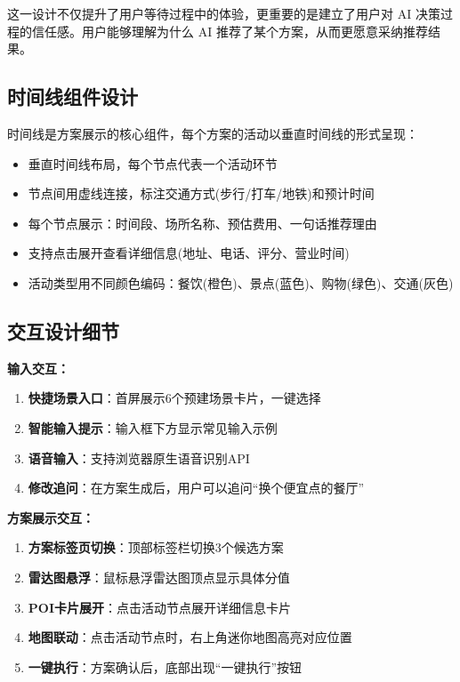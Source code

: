 \documentclass[12pt,a4paper]{ctexart}
\begin{document}
这一设计不仅提升了用户等待过程中的体验，更重要的是建立了用户对 AI 决策过程的信任感。用户能够理解为什么 AI 推荐了某个方案，从而更愿意采纳推荐结果。

\subsection{时间线组件设计}

时间线是方案展示的核心组件，每个方案的活动以垂直时间线的形式呈现：

\begin{itemize}
\item 垂直时间线布局，每个节点代表一个活动环节
\item 节点间用虚线连接，标注交通方式(步行/打车/地铁)和预计时间
\item 每个节点展示：时间段、场所名称、预估费用、一句话推荐理由
\item 支持点击展开查看详细信息(地址、电话、评分、营业时间)
\item 活动类型用不同颜色编码：餐饮(橙色)、景点(蓝色)、购物(绿色)、交通(灰色)
\end{itemize}

\subsection{交互设计细节}

\textbf{输入交互：}
\begin{enumerate}
\item \textbf{快捷场景入口}：首屏展示6个预建场景卡片，一键选择
\item \textbf{智能输入提示}：输入框下方显示常见输入示例
\item \textbf{语音输入}：支持浏览器原生语音识别API
\item \textbf{修改追问}：在方案生成后，用户可以追问``换个便宜点的餐厅''
\end{enumerate}

\textbf{方案展示交互：}
\begin{enumerate}
\item \textbf{方案标签页切换}：顶部标签栏切换3个候选方案
\item \textbf{雷达图悬浮}：鼠标悬浮雷达图顶点显示具体分值
\item \textbf{POI卡片展开}：点击活动节点展开详细信息卡片
\item \textbf{地图联动}：点击活动节点时，右上角迷你地图高亮对应位置
\item \textbf{一键执行}：方案确认后，底部出现``一键执行''按钮
\end{enumerate}
\end{document}
